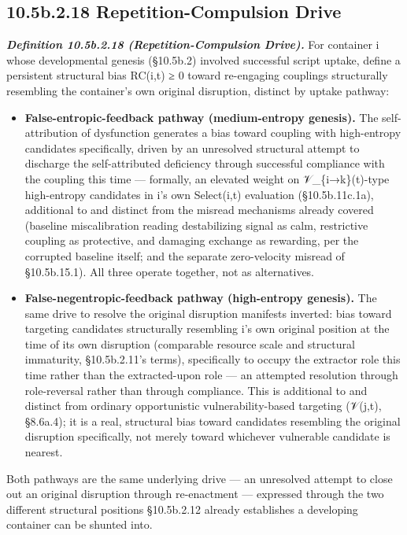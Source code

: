 \documentclass[
]{article}
\begin{document}
\hypertarget{b.2.18-repetition-compulsion-drive}{%
\subsection{10.5b.2.18 Repetition-Compulsion
Drive}\label{b.2.18-repetition-compulsion-drive}}

\emph{\textbf{Definition 10.5b.2.18 (Repetition-Compulsion Drive).}} For
container i whose developmental genesis (§10.5b.2) involved successful
script uptake, define a persistent structural bias RC(i,t) ≥ 0 toward
re-engaging couplings structurally resembling the container's own
original disruption, distinct by uptake pathway:

\begin{itemize}
\item
  \textbf{False-entropic-feedback pathway (medium-entropy genesis).} The
  self-attribution of dysfunction generates a bias toward coupling with
  high-entropy candidates specifically, driven by an unresolved
  structural attempt to discharge the self-attributed deficiency through
  successful compliance with the coupling this time --- formally, an
  elevated weight on 𝒱\_\{i→k\}(t)-type high-entropy candidates in i's
  own Select(i,t) evaluation (§10.5b.11c.1a), additional to and distinct
  from the misread mechanisms already covered (baseline miscalibration
  reading destabilizing signal as calm, restrictive coupling as
  protective, and damaging exchange as rewarding, per the corrupted
  baseline itself; and the separate zero-velocity misread of
  §10.5b.15.1). All three operate together, not as alternatives.
\item
  \textbf{False-negentropic-feedback pathway (high-entropy genesis).}
  The same drive to resolve the original disruption manifests inverted:
  bias toward targeting candidates structurally resembling i's own
  original position at the time of its own disruption (comparable
  resource scale and structural immaturity, §10.5b.2.11's terms),
  specifically to occupy the extractor role this time rather than the
  extracted-upon role --- an attempted resolution through role-reversal
  rather than through compliance. This is additional to and distinct
  from ordinary opportunistic vulnerability-based targeting (𝒱(j,t),
  §8.6a.4); it is a real, structural bias toward candidates resembling
  the original disruption specifically, not merely toward whichever
  vulnerable candidate is nearest.
\end{itemize}

Both pathways are the same underlying drive --- an unresolved attempt to
close out an original disruption through re-enactment --- expressed
through the two different structural positions §10.5b.2.12 already
establishes a developing container can be shunted into.
\end{document}
